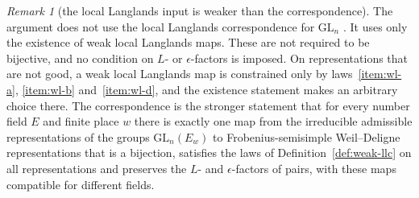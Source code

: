 \documentclass[11pt]{amsbook}
\theoremstyle{plain}
\theoremstyle{definition}
\theoremstyle{remark}
\newtheorem{remark}[theorem]{Remark}
\numberwithin{equation}{section}
\numberwithin{figure}{chapter}
\numberwithin{table}{chapter}
\begin{document}
\begin{remark}[the local Langlands input is weaker than the
correspondence]\label{rem:llc}
The argument does not use the local Langlands correspondence for
$\mathrm{GL}_n$ \cite{HarrisTaylor2001,Henniart2000,Scholze2013}. It
uses only the existence of weak local Langlands maps. These are not required to
be bijective, and no condition on $L$- or $\epsilon$-factors is
imposed. On representations that are not good, a weak local Langlands
map is constrained only by laws~\ref{item:wl-a}, \ref{item:wl-b}
and~\ref{item:wl-d}, and the existence statement makes an arbitrary
choice there. The correspondence is the stronger statement that for
every number field $E$ and finite place $w$ there is exactly one map
from the irreducible admissible representations of the groups
$\mathrm{GL}_n(E_w)$ to
Frobenius-semisimple Weil--Deligne representations that is a
bijection, satisfies the laws of Definition~\ref{def:weak-llc} on all
representations and preserves the $L$- and $\epsilon$-factors of
pairs, with these maps compatible for different fields.
\end{remark}
\end{document}
